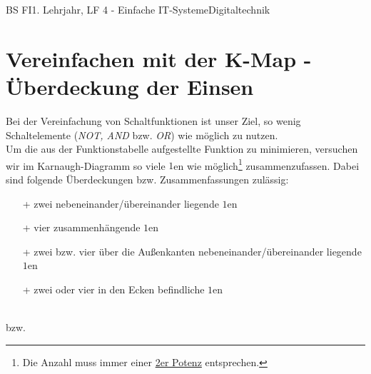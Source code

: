 \documentclass[11pt,twocolumn,oneside,openany,headings=optiontotoc,11pt,numbers=noenddot]{article}
\begin{document}
\begin{worksheet}{BS FI}{1. Lehrjahr, LF 4 - Einfache IT-Systeme}{Digitaltechnik}
		\section*{Vereinfachen mit der K-Map - Überdeckung der Einsen}
		Bei der Vereinfachung von Schaltfunktionen ist unser Ziel, so wenig Schaltelemente (\textit{NOT, AND} bzw. \textit{OR}) wie möglich zu nutzen.\\
		Um die aus der Funktionstabelle aufgestellte Funktion zu minimieren, versuchen wir im Karnaugh-Diagramm so viele \(1\)en wie möglich\footnote{Die Anzahl muss immer einer \underline{2er Potenz} entsprechen.} zusammenzufassen. Dabei sind folgende Überdeckungen bzw. Zusammenfassungen zulässig:
		\begin{itemize}
			\item[+] zwei nebeneinander/übereinander liegende \(1\)en\\
			\begin{karnaugh-map}[4][4][1][$x_1x_0$][$x_3x_2$]
			\end{karnaugh-map}
			\item[+] vier zusammenhängende \(1\)en\\
			\begin{karnaugh-map}[4][4][1][$x_1x_0$][$x_3x_2$]
			\end{karnaugh-map}
			\item[+] zwei bzw. vier über die Außenkanten nebeneinander/übereinander liegende \(1\)en
			\begin{karnaugh-map}[4][4][1][$x_1x_0$][$x_3x_2$]
			\end{karnaugh-map}
			\item[+] zwei oder vier in den Ecken befindliche \(1\)en
		\end{itemize}
		\begin{karnaugh-map}[4][4][1][$x_1x_0$][$x_3x_2$]
		\end{karnaugh-map}\\
		bzw.\\
		\begin{karnaugh-map}[4][4][1][$x_1x_0$][$x_3x_2$]
			\implicantcorner
		\end{karnaugh-map}
	\end{worksheet}
\end{document}
